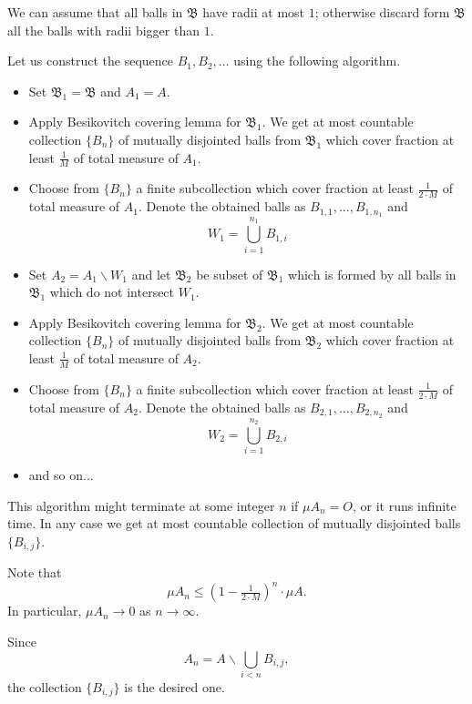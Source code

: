 We can assume that all balls in $\mathfrak{B}$ have radii at most $1$;
otherwise discard form $\mathfrak{B}$ all the balls with radii bigger than $1$.

Let us construct the sequence $B_1,B_2,\dots$ using the following algorithm.

\begin{itemize}
\item Set $\mathfrak{B}_1=\mathfrak{B}$ and $A_1=A$.
\item Apply Besikovitch covering lemma for $\mathfrak{B}_1$.
We get at most countable collection $\{B_n\}$ of mutually disjointed balls from $\mathfrak{B}_1$ which cover fraction at least $\tfrac{1}M$ of total measure of $A_1$.
\item Choose from $\{B_n\}$ a finite subcollection which cover fraction at least $\tfrac{1}{2\cdot M}$ of total measure of $A_1$.
Denote the obtained balls as $B_{1,1},\dots,B_{1,n_1}$ and 
$$W_1=\bigcup_{i=1}^{n_1}B_{1,i}$$
\item Set $A_2= A_1\backslash W_1$ and let $\mathfrak{B}_2$ be subset of $\mathfrak{B}_1$ which is formed by all balls in $\mathfrak{B}_1$ which do not intersect $W_1$. 
\item Apply Besikovitch covering lemma for $\mathfrak{B}_2$.
We get at most countable collection $\{B_n\}$ of mutually disjointed balls from $\mathfrak{B}_2$ which cover fraction at least $\tfrac{1}M$ of total measure of $A_2$.
\item Choose from $\{B_n\}$ a finite subcollection which cover fraction at least $\tfrac{1}{2\cdot M}$ of total measure of $A_2$.
Denote the obtained balls as $B_{2,1},\dots,B_{2,n_2}$ and 
$$W_2=\bigcup_{i=1}^{n_2}B_{2,i}$$
\item and so on...
\end{itemize}
This algorithm might terminate at some integer $n$ if $\mu A_n=O$, or it runs infinite time.
In any case we get at most countable collection of mutually disjointed balls $\{B_{i,j}\}$.

Note that 
\[\mu A_n\le (1-\tfrac1{2\cdot M})^n\cdot\mu A.\]
In particular, $\mu A_n\to 0$ as $n\to\infty$.

Since 
\[A_n=A\backslash \bigcup_{i<n} B_{i,j},\]
the collection $\{B_{i,j}\}$ is the desired one.
\qeds
























